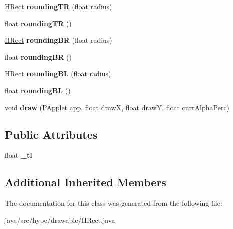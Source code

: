 \begin{DoxyCompactItemize}
\item 
\hypertarget{classhype_1_1drawable_1_1_h_rect_a45caa227a5f1d8d5c81b534ebed047e0}{\hyperlink{classhype_1_1drawable_1_1_h_rect}{H\-Rect} {\bfseries rounding\-T\-R} (float radius)}\label{classhype_1_1drawable_1_1_h_rect_a45caa227a5f1d8d5c81b534ebed047e0}

\item 
\hypertarget{classhype_1_1drawable_1_1_h_rect_a7c79febd61c038934a1b8018f519ccda}{float {\bfseries rounding\-T\-R} ()}\label{classhype_1_1drawable_1_1_h_rect_a7c79febd61c038934a1b8018f519ccda}

\item 
\hypertarget{classhype_1_1drawable_1_1_h_rect_a4a1cacf3d57d913d12bb556995f12892}{\hyperlink{classhype_1_1drawable_1_1_h_rect}{H\-Rect} {\bfseries rounding\-B\-R} (float radius)}\label{classhype_1_1drawable_1_1_h_rect_a4a1cacf3d57d913d12bb556995f12892}

\item 
\hypertarget{classhype_1_1drawable_1_1_h_rect_a096f9a60d0654c3fc05d51d5741b917e}{float {\bfseries rounding\-B\-R} ()}\label{classhype_1_1drawable_1_1_h_rect_a096f9a60d0654c3fc05d51d5741b917e}

\item 
\hypertarget{classhype_1_1drawable_1_1_h_rect_a52eda9ea544fe6feb1eeef50ac8d03e4}{\hyperlink{classhype_1_1drawable_1_1_h_rect}{H\-Rect} {\bfseries rounding\-B\-L} (float radius)}\label{classhype_1_1drawable_1_1_h_rect_a52eda9ea544fe6feb1eeef50ac8d03e4}

\item 
\hypertarget{classhype_1_1drawable_1_1_h_rect_a049a529b6800428757a8211107096ef6}{float {\bfseries rounding\-B\-L} ()}\label{classhype_1_1drawable_1_1_h_rect_a049a529b6800428757a8211107096ef6}

\item 
\hypertarget{classhype_1_1drawable_1_1_h_rect_af7407651343cf3b7b5e734d4b2f874c2}{void {\bfseries draw} (P\-Applet app, float draw\-X, float draw\-Y, float curr\-Alpha\-Perc)}\label{classhype_1_1drawable_1_1_h_rect_af7407651343cf3b7b5e734d4b2f874c2}

\end{DoxyCompactItemize}
\subsection*{Public Attributes}
\begin{DoxyCompactItemize}
\item 
\hypertarget{classhype_1_1drawable_1_1_h_rect_a6f2696359b3f60a7c28cbb5d41ad6519}{float {\bfseries \-\_\-tl}}\label{classhype_1_1drawable_1_1_h_rect_a6f2696359b3f60a7c28cbb5d41ad6519}

\end{DoxyCompactItemize}
\subsection*{Additional Inherited Members}


The documentation for this class was generated from the following file\-:\begin{DoxyCompactItemize}
\item 
java/src/hype/drawable/H\-Rect.\-java\end{DoxyCompactItemize}
